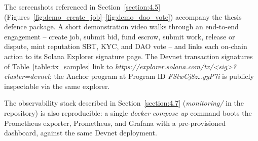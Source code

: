 The screenshots referenced in Section~\ref{section:4.5} (Figures~\ref{fig:demo_create_job}--\ref{fig:demo_dao_vote}) accompany the thesis defence package. A short demonstration video walks through an end-to-end engagement -- create job, submit bid, fund escrow, submit work, release or dispute, mint reputation SBT, KYC, and DAO vote -- and links each on-chain action to its Solana Explorer signature page. The Devnet transaction signatures of Table~\ref{table:tx_samples} link to \emph{https://explorer.solana.com/tx/\textless{}sig\textgreater{}?cluster=devnet}; the Anchor program at Program ID \emph{FStwCj8z\ldots yyP7i} is publicly inspectable via the same explorer.

The observability stack described in Section~\ref{section:4.7} (\emph{monitoring/} in the repository) is also reproducible: a single \emph{docker compose up} command boots the Prometheus exporter, Prometheus, and Grafana with a pre-provisioned dashboard, against the same Devnet deployment.

